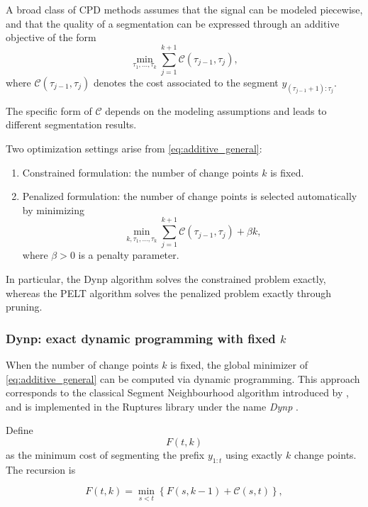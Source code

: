 \documentclass[preprints,article,submit,pdftex,moreauthors]{Definitions/mdpi}
\begin{document}
A broad class of CPD methods assumes that the signal can be modeled piecewise, and that the quality of a segmentation can be expressed through an additive objective of the form
\begin{equation}
	\label{eq:additive_general}
	\min_{\tau_1,\dots,\tau_k}
	\sum_{j=1}^{k+1} \mathcal{C}(\tau_{j-1},\tau_j),
\end{equation}
where $\mathcal{C}(\tau_{j-1},\tau_j)$ denotes the cost associated to the segment $y_{(\tau_{j-1}+1):\tau_j}$.

The specific form of $\mathcal{C}$ depends on the modeling assumptions and leads to different segmentation results.

Two optimization settings arise from \eqref{eq:additive_general}:
\begin{enumerate}
	\item Constrained formulation: the number of change points $k$ is fixed.
	\item Penalized formulation: the number of change points is selected automatically by minimizing
	\begin{equation}
		\label{eq:penalized_general}
		\min_{k,\tau_1,\dots,\tau_k}
		\sum_{j=1}^{k+1} \mathcal{C}(\tau_{j-1},\tau_j)
		+ \beta k,
	\end{equation}
	where $\beta>0$ is a penalty parameter. 
\end{enumerate}

In particular, the Dynp algorithm solves the constrained problem exactly, whereas the PELT algorithm solves the penalized problem exactly through pruning.

\subsubsection{Dynp: exact dynamic programming with fixed $k$}

When the number of change points $k$ is fixed, the global minimizer of \eqref{eq:additive_general} can be computed via dynamic programming. 
This approach corresponds to the classical Segment Neighbourhood algorithm introduced by \cite{AL89}, and is implemented in the Ruptures library under the name {\it Dynp} \cite{rupweb}.

Define
\[
F(t,k)
\]
as the minimum cost of segmenting the prefix $y_{1:t}$ using exactly $k$ change points. The recursion is

\begin{equation}
	\label{eq:dynp_recursion_consistent}
	F(t,k)
	=
	\min_{s < t}
	\left\{
	F(s,k-1)
	+
	\mathcal{C}(s,t)
	\right\},
\end{equation}
\end{document}
